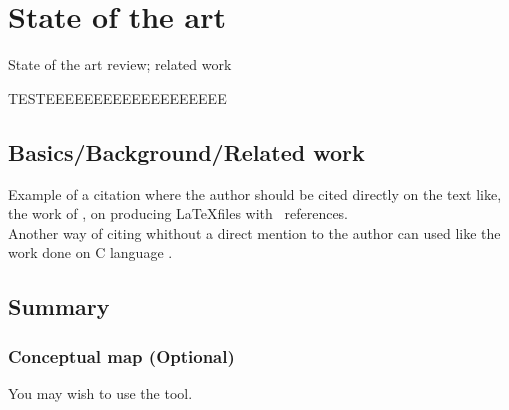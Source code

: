 \chapter{State of the art}
	State of the art review; related work

	TESTEEEEEEEEEEEEEEEEEEE

\section{Basics/Background/Related work}
Example of a citation where the author should be cited directly on the text like, the work of \cite{GRM97}, on producing \LaTeX files with \Bibtex\ references. \\
Another way of citing whithout a direct mention to the author can used like the work done on C language \citep{KeR88}.

	\section{Summary}
	\subsection{Conceptual map (Optional)}
You may wish to use the  tool.
